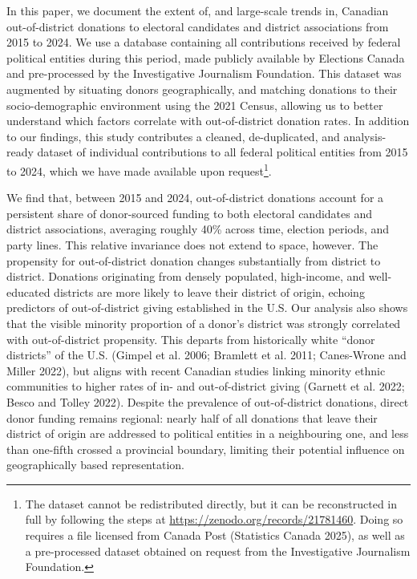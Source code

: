 \documentclass[
  letterpaper,
  DIV=11,
  numbers=noendperiod]{scrartcl}
\begin{document}
In this paper, we document the extent of, and large-scale trends in,
Canadian out-of-district donations to electoral candidates and district
associations from 2015 to 2024. We use a database containing all
contributions received by federal political entities during this period,
made publicly available by Elections Canada and pre-processed by the
Investigative Journalism Foundation. This dataset was augmented by
situating donors geographically, and matching donations to their
socio-demographic environment using the 2021 Census, allowing us to
better understand which factors correlate with out-of-district donation
rates. In addition to our findings, this study contributes a cleaned,
de-duplicated, and analysis-ready dataset of individual contributions to
all federal political entities from 2015 to 2024, which we have made
available upon request\footnote{The dataset cannot be redistributed
  directly, but it can be reconstructed in full by following the steps
  at \url{https://zenodo.org/records/21781460}. Doing so requires a file
  licensed from Canada Post (Statistics Canada 2025), as well as a
  pre-processed dataset obtained on request from the Investigative
  Journalism Foundation.}.

We find that, between 2015 and 2024, out-of-district donations account
for a persistent share of donor-sourced funding to both electoral
candidates and district associations, averaging roughly 40\% across
time, election periods, and party lines. This relative invariance does
not extend to space, however. The propensity for out-of-district
donation changes substantially from district to district. Donations
originating from densely populated, high-income, and well-educated
districts are more likely to leave their district of origin, echoing
predictors of out-of-district giving established in the U.S. Our
analysis also shows that the visible minority proportion of a donor's
district was strongly correlated with out-of-district propensity. This
departs from historically white ``donor districts'' of the U.S. (Gimpel
et al. 2006; Bramlett et al. 2011; Canes-Wrone and Miller 2022), but
aligns with recent Canadian studies linking minority ethnic communities
to higher rates of in- and out-of-district giving (Garnett et al. 2022;
Besco and Tolley 2022). Despite the prevalence of out-of-district
donations, direct donor funding remains regional: nearly half of all
donations that leave their district of origin are addressed to political
entities in a neighbouring one, and less than one-fifth crossed a
provincial boundary, limiting their potential influence on
geographically based representation.
\end{document}
